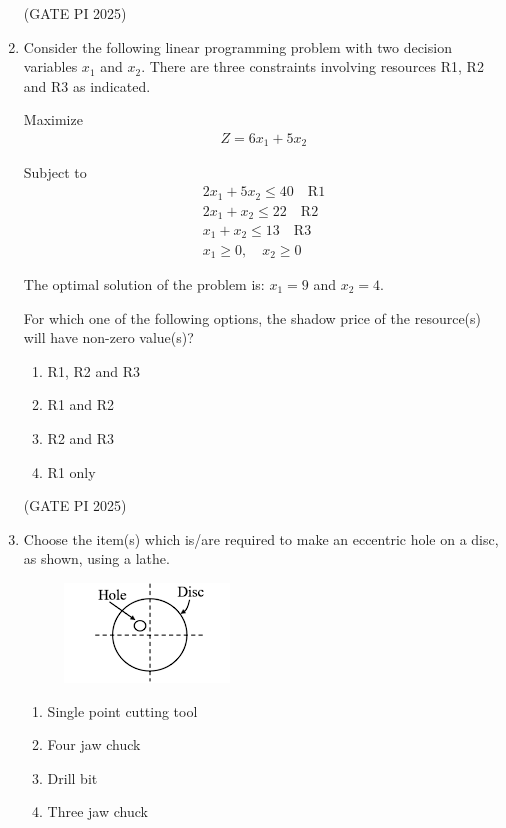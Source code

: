 \documentclass[journal,12pt,onecolumn]{IEEEtran}
\theoremstyle{remark}
\begin{document}
\begin{enumerate}
\hfill (GATE PI 2025)

\item  Consider the following linear programming problem with two decision variables $x_1$ and $x_2$. There are three constraints involving resources R1, R2 and R3 as indicated.

Maximize
\begin{align*}
    Z = 6x_1 + 5x_2
\end{align*}

Subject to
\begin{align*}
2x_1 + 5x_2 \leq 40 \quad \text{R1} \\
2x_1 + x_2 \leq 22 \quad \text{R2} \\
x_1 + x_2 \leq 13 \quad \text{R3} \\
x_1 \geq 0,\quad x_2 \geq 0 
\end{align*}

The optimal solution of the problem is: $x_1 = 9$ and $x_2 = 4$.

For which one of the following options, the shadow price of the resource(s) will have non-zero value(s)?

\begin{multicols}{2}
\begin{enumerate}
\item R1, R2 and R3
\item R1 and R2
\item R2 and R3
\item R1 only
\end{enumerate}
\end{multicols}

\hfill (GATE PI 2025)

\item Choose the item(s) which is/are required to make an eccentric hole on a disc, as shown, using a lathe.

\begin{figure}[H]
\centering
\includegraphics[width=0.5\columnwidth]{fig9.png}
\caption{}
\end{figure}

\begin{multicols}{2}
\begin{enumerate}
\item Single point cutting tool
\item Four jaw chuck
\item Drill bit
\item Three jaw chuck
\end{enumerate}
\end{multicols}


\end{enumerate}
\end{document}
